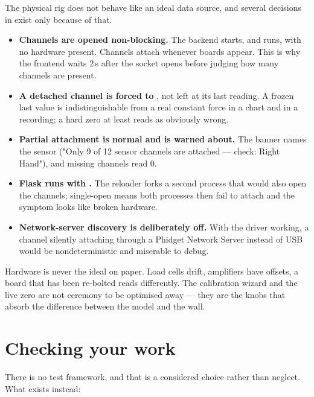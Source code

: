 \documentclass[11pt,a4paper]{article}
\begin{document}
The physical rig does not behave like an ideal data source, and several
decisions in  exist only because of that.

\begin{itemize}
  \item \textbf{Channels are opened non-blocking.} The backend starts, and runs,
        with no hardware present. Channels attach whenever boards appear. This
        is why the frontend waits 2\,s after the socket opens before judging how
        many channels are present.
  \item \textbf{A detached channel is forced to }, not left at its last
        reading. A frozen last value is indistinguishable from a real constant
        force in a chart and in a recording; a hard zero at least reads as
        obviously wrong.
  \item \textbf{Partial attachment is normal and is warned about.} The banner
        names the sensor ("Only 9 of 12 sensor channels are attached --- check:
        Right Hand"), and missing channels read 0.
  \item \textbf{Flask runs with .} The reloader forks a
        second process that would also open the channels; single-open means both
        processes then fail to attach and the symptom looks like broken hardware.
  \item \textbf{Network-server discovery is deliberately off.} With the driver
        working, a channel silently attaching through a Phidget Network Server
        instead of USB would be nondeterministic and miserable to debug.
\end{itemize}

\begin{warnbox}
Hardware is never the ideal on paper. Load cells drift, amplifiers have offsets,
a board that has been re-bolted reads differently. The calibration wizard and
the live zero are not ceremony to be optimised away --- they are the knobs that
absorb the difference between the model and the wall.
\end{warnbox}

\section{Checking your work}

There is no test framework, and that is a considered choice rather than
neglect. What exists instead:
\end{document}

